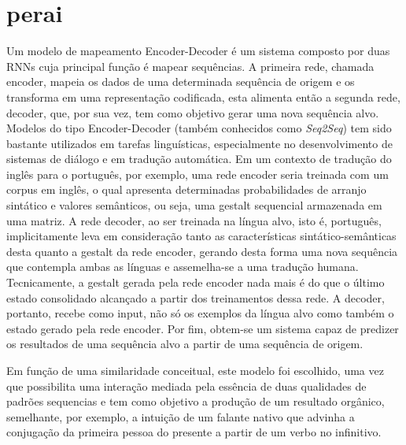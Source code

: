 \section{perai}
Um modelo de mapeamento Encoder-Decoder é um sistema composto por duas RNNs cuja principal função é mapear sequências. A primeira rede, chamada encoder, mapeia os dados de uma determinada sequência de origem e os transforma em uma representação codificada, esta alimenta então a segunda rede, decoder, que, por sua vez, tem como objetivo gerar uma nova sequência alvo.  %
Modelos do tipo Encoder-Decoder (também conhecidos como \textit{Seq2Seq}) tem sido bastante utilizados em tarefas linguísticas, especialmente no desenvolvimento de sistemas de diálogo e em tradução automática. Em um contexto de tradução do inglês para o português, por exemplo, uma rede encoder seria treinada com um corpus em inglês, o qual apresenta determinadas probabilidades de arranjo sintático e valores semânticos, ou seja, uma gestalt sequencial armazenada em uma matriz. A rede decoder, ao ser treinada na língua alvo, isto é, português, implicitamente leva em consideração tanto as características sintático-semânticas desta quanto a gestalt da rede encoder, gerando desta forma uma nova sequência que contempla ambas as línguas e assemelha-se a uma tradução humana. Tecnicamente, a gestalt gerada pela rede encoder nada mais é do que o último estado consolidado alcançado a partir dos treinamentos dessa rede. A decoder, portanto, recebe como input, não só os exemplos da língua alvo como também o estado gerado pela rede encoder. Por fim, obtem-se um sistema capaz de predizer os resultados de uma sequência alvo a partir de uma sequência de origem.

Em função de uma similaridade conceitual, este modelo foi escolhido, uma vez que possibilita uma interação mediada pela essência de duas qualidades de padrões sequencias e tem como objetivo a produção de um resultado orgânico, semelhante, por exemplo, a intuição de um falante nativo que advinha a conjugação da primeira pessoa do presente a partir de um verbo no infinitivo. 





